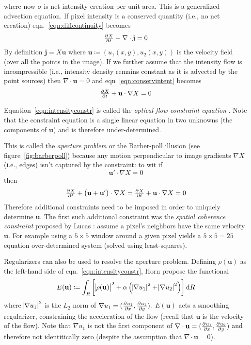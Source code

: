 where now \(\sigma\) is net intensity creation per unit area.
%
This is a generalized advection equation.
%
If pixel intensity is a conserved quantity (i.e., no net creation) eqn.~\eqref{eqn:diffcontinuity} becomes
\begin{equation}
	\pd{X}{t} + \nabla \cdot \mathbf{j} = 0
	\label{eqn:conservintent}
\end{equation}
By definition \(\mathbf{j} = X\mathbf{u}\) where \(\mathbf{u} \coloneqq (u_1(x,y), u_2(x,y))\) is the velocity field (over all the points in the image).
%
If we further assume that the intensity flow is incompressible (i.e., intensity density remains constant as it is advected by the point sources) then \(\nabla \cdot \mathbf{u} = 0\) and eqn~\eqref{eqn:conservintent} becomes
\begin{equation}
	\pd{X}{t} + \mathbf{u} \cdot \nabla X = 0
	\label{eqn:intensityconstr}
\end{equation}

Equation~\eqref{eqn:intensityconstr} is called the \textit{optical flow constraint equation} \cite{perez2013tv}.
%
Note that the constraint equation is a single linear equation in two unknowns (the components of \(\mathbf{u}\)) and is therefore under-determined.
%

%
This is called the \textit{aperture problem} or the Barber-poll illusion (see figure~\ref{fig:barberpoll}) because any motion perpendicular to image gradients \(\nabla X\) (i.e., edges) isn't captured by the constraint: to wit if 
\[\mathbf{u}' \cdot \nabla X= 0\] 
then 
\[
	\pd{X}{t} + \left(\mathbf{u} + \mathbf{u}' \right) \cdot \nabla X = \pd{X}{t} + \mathbf{u} \cdot \nabla X = 0
\]
%
Therefore additional constraints need to be imposed in order to uniquely determine \(\mathbf{u}\).
%
The first such additional constraint was the \textit{spatial coherence constraint} proposed by Lucas \etal \cite{lucas1981iterative}: assume a pixel's neighbors have the same velocity \(\mathbf{u}\).
%
For example using a \(5 \times 5\) window around a given pixel yields a \(5\times5 = 25\) equation over-determined system (solved using least-squares).

Regularizers can also be used to resolve the aperture problem. 
%
Defining \(\rho(\mathbf{u})\) as the left-hand side of eqn.~\eqref{eqn:intensityconstr}, Horn \etal \cite{horn1993determining} propose the functional
\begin{equation}
	E(\mathbf{u}) \coloneqq \int_R \left[ \abs{\rho(\mathbf{u})}^2 + \alpha \left( \abs{ \nabla u_1 }^2 + \abs{ \nabla u_2 }^2\right) \right] \dif R
	\label{eqn:linearhorn}
\end{equation}
where \(\abs{ \nabla u_1 }^2\) is the \(L_2\) norm of \(\nabla u_1 = (\pd{u_1}{x}, \pd{u_1}{y})\).
%
\(E(\mathbf{u})\) acts a smoothing regularizer, constraining the acceleration of the flow (recall that \(\mathbf{u}\) is the velocity of the flow).
%
Note that \(\nabla u_1\) is not the first component of \(\nabla \cdot \mathbf{u} = (\pd{u_1}{x}, \pd{u_2}{y})\) and therefore not identitically zero (despite the assumption that  \(\nabla \cdot \mathbf{u} = 0\)).

